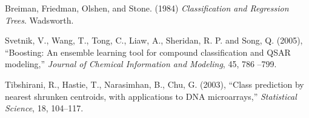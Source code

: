 \documentclass[12pt]{article}
\begin{document}
\begin{description}

   
   \item Breiman, Friedman, Olshen, and Stone. (1984) {\it Classification and Regression Trees}. Wadsworth.


   \item Svetnik, V., Wang, T., Tong, C., Liaw, A., Sheridan, R. P. and Song, Q. (2005), ``Boosting: An ensemble learning tool for compound classification and QSAR modeling,'' {\it Journal of Chemical Information and Modeling}, 45, 786 --799.
   
   \item Tibshirani, R., Hastie, T., Narasimhan, B., Chu, G. (2003), ``Class prediction by nearest shrunken centroids, with applications to DNA microarrays,'' {\it  Statistical Science}, 18, 104--117.


\end{description}
\end{document}
